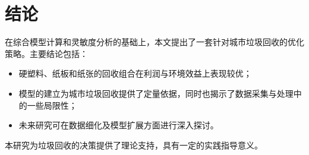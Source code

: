 \section{结论}
在综合模型计算和灵敏度分析的基础上，本文提出了一套针对城市垃圾回收的优化策略。主要结论包括：
\begin{itemize}
  \item 硬塑料、纸板和纸张的回收组合在利润与环境效益上表现较优；
  \item 模型的建立为城市垃圾回收提供了定量依据，同时也揭示了数据采集与处理中的一些局限性；
  \item 未来研究可在数据细化及模型扩展方面进行深入探讨。
\end{itemize}

本研究为垃圾回收的决策提供了理论支持，具有一定的实践指导意义。

